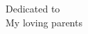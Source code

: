 \thispagestyle{empty}%
\vspace*{0.25\textheight}
\begin{center}
{ {Dedicated to}}\\
\vspace*{2.0\baselineskip}
{ {\calligra My loving parents}}\\
\vspace*{0.5\baselineskip}
\end{center}
